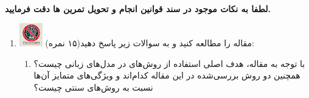 \documentclass[12pt]{article}
\begin{document}
\fontsize{12pt}{14pt}\selectfont



\\
{\fontsize{14}{22}\selectfont \textbf{لطفا به نکات موجود در سند قوانین انجام و تحویل تمرین ها دقت فرمایید. }}

\begin{enumerate}

    \section*{سوالات تئوری}
    \item \includegraphics[width=1cm]{figs/Forbidden_AI.jpg}
    مقاله \href{https://proceedings.neurips.cc/paper_files/paper/2023/file/299a08ee712d4752c890938da99a77c6-Paper-Conference.pdf}{} را مطالعه کنید و به سوالات زیر پاسخ دهید(۱۵ نمره):
    \begin{enumerate}
        \item با توجه به مقاله، هدف اصلی استفاده از روش‌های  در مدل‌های زبانی چیست؟ همچنین دو روش  بررسی‌شده در این مقاله کدام‌اند و ویژگی‌های متمایز آن‌ها نسبت به روش‌های سنتی  چیست؟
        

\end{enumerate}
\end{enumerate}
\end{document}
